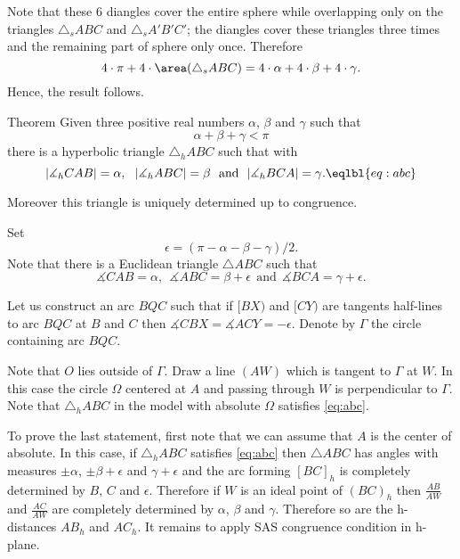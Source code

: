 Note that these 6 diangles cover the entire sphere while overlapping
only on the triangles $\triangle_s ABC$ and $\triangle_s A'B'C'$;
the diangles cover these triangles three times and the remaining part of sphere only once.
Therefore 
$$
4\cdot\pi + 4\cdot\area(\triangle_s ABC)= 4\cdot \alpha+4\cdot \beta+4\cdot\gamma.
$$
Hence, the result follows.
\qeds













\begin{thm}{Theorem}\label{thm:sum-trig-h}
Given three positive real numbers $\alpha$, $\beta$ and $\gamma$ such that
$$\alpha+\beta+\gamma<\pi$$ 
there is a hyperbolic triangle $\triangle_hABC$
such that with
$$|\measuredangle_hCAB|=\alpha,\ \ |\measuredangle_hABC|=\beta\ \ \text{and}\ \ |\measuredangle_hBCA|=\gamma.\eqlbl{eq:abc}$$
 
Moreover this triangle is uniquely determined up to congruence. 
\end{thm}


Set 
$$\epsilon=(\pi-\alpha-\beta-\gamma)/2.$$
Note that there is a Euclidean triangle $\triangle ABC$ such that 
$$\measuredangle CAB=\alpha,\ \ \measuredangle ABC=\beta+\epsilon\ \ \text{and}\ \ \measuredangle BCA=\gamma+\epsilon.$$

Let us construct an arc $BQC$
such that if $[BX)$ and $[CY)$ are tangents half-lines to arc $BQC$
at $B$ and $C$ then $\measuredangle CBX=\measuredangle ACY=-\epsilon$.
Denote by $\Gamma$ the circle containing arc $BQC$.

Note that $O$ lies outside of $\Gamma$.
Draw a line $(AW)$ which is tangent to $\Gamma$ at $W$.
In this case the circle $\Omega$ centered at $A$  and passing through $W$
is perpendicular to $\Gamma$.
Note that $\triangle_h ABC$ in the model with absolute $\Omega$ satisfies \ref{eq:abc}. 

To prove the last statement, first note that we can assume that $A$ is the center of absolute.
In this case, if $\triangle_hABC$ satisfies \ref{eq:abc}
then $\triangle ABC$ has angles with measures 
$\pm \alpha$, $\pm \beta+\epsilon$ and $\gamma+\epsilon$
and the arc forming $[BC]_h$ is completely determined by  $B$, $C$ and $\epsilon$.
Therefore if $W$ is an ideal point of $(BC)_h$ then $\tfrac {AB}{AW}$ and $\tfrac {AC}{AW}$ are completely determined by $\alpha$, $\beta$ and $\gamma$.
Therefore so are the h-distances $AB_h$ and $AC_h$. 
It remains to apply SAS congruence condition in h-plane.
\qeds












